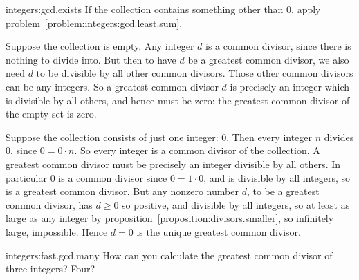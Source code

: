\begin{answer}{integers:gcd.exists}
If the collection contains something other than \(0\), apply problem~\vref{problem:integers:gcd.least.sum}.

Suppose the collection is empty.
Any integer \(d\) is a common divisor, since there is nothing to divide into.
But then to have \(d\) be a greatest common divisor, we also need \(d\) to be divisible by all other common divisors.
Those other common divisors can be any integers.
So a greatest common divisor \(d\) is precisely an integer which is divisible by all others, and hence must be zero: the greatest common divisor of the empty set is zero.

Suppose the collection consists of just one integer: \(0\).
Then every integer \(n\) divides \(0\), since \(0=0\cdot n\).
So every integer is a common divisor of the collection.
A greatest common divisor must be precisely an integer divisible by all others.
In particular \(0\) is a common divisor since \(0=1\cdot 0\), and is divisible by all integers, so is a greatest common divisor.
But any nonzero number \(d\), to be a greatest common divisor, has \(d\ge 0\) so positive, and divisible by all integers, so at least as large as any integer by proposition~\vref{proposition:divisors.smaller}, so infinitely large, impossible.
Hence \(d=0\) is the unique greatest common divisor.
\end{answer}
\begin{problem}{integers:fast.gcd.many}
How can you calculate the greatest common divisor of three integers? Four?
\end{problem}

